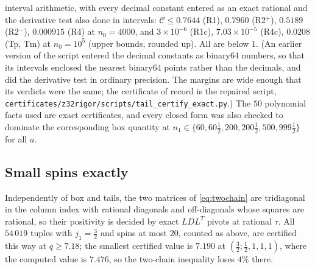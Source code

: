 interval arithmetic, with every decimal constant entered as an exact rational and the
derivative test also done in intervals: $\mathcal C\le0.7644$ (R1), $0.7960$ (R2$^+$),
$0.5189$ (R2$^-$), $0.000915$ (R4) at $n_0=4000$, and $3\times10^{-6}$ (R1c),
$7.03\times10^{-5}$ (R4c), $0.0208$ (Tp, Tm) at $n_0=10^5$ (upper bounds, rounded up). All
are below $1$. (An earlier version of the script entered the decimal constants as binary64
numbers, so that its intervals enclosed the nearest binary64 points rather than the decimals,
and did the derivative test in ordinary precision. The margins are wide enough that its
verdicts were the same; the certificate of record is the repaired script,
\texttt{certificates/z32rigor/scripts/tail\_certify\_exact.py}.) The $50$ polynomial facts used are exact certificates,
and every closed form was also checked to dominate the corresponding box quantity at
$n_1\in\{60,60\frac12,200,200\frac12,500,999\frac12\}$ for all $a$.

\subsection{Small spins exactly}

Independently of box and tails, the two matrices of \eqref{eq:twochain} are tridiagonal
in the column index with rational diagonals and off-diagonals whose squares are rational,
so their positivity is decided by exact $LDL^T$ pivots at rational $\tau$. All $54\,019$ tuples
with $j_1=\frac32$ and spins at most $20$, counted as above, are certified this way at $q\ge7.18$; the smallest
certified value is $7.190$ at $(\frac32;\frac12,1,1,1)$, where the computed value is $7.476$, so the
two-chain inequality loses $4\%$ there.
